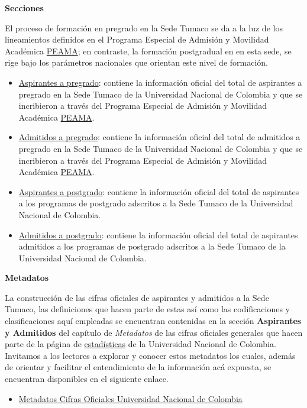 \documentclass[
]{book}
\providecommand{\tightlist}{%
  \setlength{\itemsep}{0pt}\setlength{\parskip}{0pt}}
\begin{document}
\textbf{Secciones}

El proceso de formación en pregrado en la Sede Tumaco se da a la luz de los lineamientos definidos en el Programa Especial de Admisión y Movilidad Académica \protect\hyperlink{peama}{PEAMA}; en contraste, la formación postgradual en en esta sede, se rige bajo los parámetros nacionales que orientan este nivel de formación.

\begin{itemize}
\item
  \protect\hyperlink{AspPre}{Aspirantes a pregrado}: contiene la información oficial del total de aspirantes a pregrado en la Sede Tumaco de la Universidad Nacional de Colombia y que se incribieron a través del Programa Especial de Admisión y Movilidad Académica \protect\hyperlink{peama}{PEAMA}.
\item
  \protect\hyperlink{AdmPre}{Admitidos a pregrado}: contiene la información oficial del total de admitidos a pregrado en la Sede Tumaco de la Universidad Nacional de Colombia y que se incribieron a través del Programa Especial de Admisión y Movilidad Académica \protect\hyperlink{peama}{PEAMA}.
\item
  \protect\hyperlink{AspPos}{Aspirantes a postgrado}: contiene la información oficial del total de aspirantes a los programas de postgrado adscritos a la Sede Tumaco de la Universidad Nacional de Colombia.
\item
  \protect\hyperlink{AdmPos}{Admitidos a postgrado}: contiene la información oficial del total de aspirantes admitidos a los programas de postgrado adscritos a la Sede Tumaco de la Universidad Nacional de Colombia.
\end{itemize}

\textbf{Metadatos}

La construcción de las cifras oficiales de aspirantes y admitidos a la Sede Tumaco, las definiciones que hacen parte de estas así como las codificaciones y clasificaciones aquí empleadas se encuentran contenidas en la sección \textbf{Aspirantes y Admitidos} del capítulo de \emph{Metadatos} de las cifras oficiales generales que hacen parte de la página de \href{http://estadisticas.unal.edu.co/home/}{estadísticas} de la Universidad Nacional de Colombia. Invitamos a los lectores a explorar y conocer estos metadatos los cuales, además de orientar y facilitar el entendimiento de la información acá expuesta, se encuentran disponibles en el siguiente enlace.

\begin{itemize}
\tightlist
\item
  \href{http://estadisticas.unal.edu.co/menu-principal/cifras-generales/metadatos/cifras-generales/}{Metadatos Cifras Oficiales Universidad Nacional de Colombia}
\end{itemize}
\end{document}
